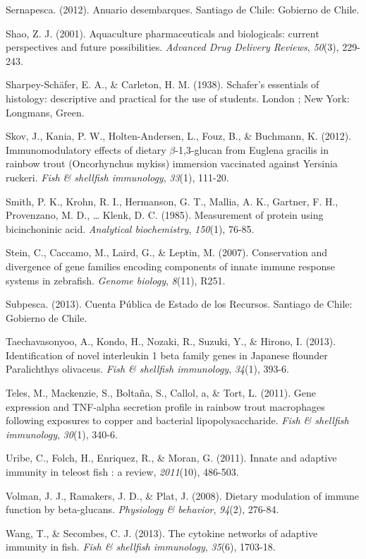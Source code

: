 \documentclass[12pt,letterpaper,oneside]{scrbook}
\begin{document}
Sernapesca. (2012). Anuario desembarques. Santiago de Chile: Gobierno de
Chile.

Shao, Z. J. (2001). Aquaculture pharmaceuticals and biologicals: current
perspectives and future possibilities. \emph{Advanced Drug Delivery
Reviews}, \emph{50}(3), 229-243.

Sharpey-Schäfer, E. A., \& Carleton, H. M. (1938). Schafer's essentials
of histology: descriptive and practical for the use of students. London
; New York: Longmans, Green.

Skov, J., Kania, P. W., Holten-Andersen, L., Fouz, B., \& Buchmann, K.
(2012). Immunomodulatory effects of dietary \(\beta\)-1,3-glucan from
Euglena gracilis in rainbow trout (Oncorhynchus mykiss) immersion
vaccinated against Yersinia ruckeri. \emph{Fish \& shellfish
immunology}, \emph{33}(1), 111-20.

Smith, P. K., Krohn, R. I., Hermanson, G. T., Mallia, A. K., Gartner, F.
H., Provenzano, M. D., \ldots{} Klenk, D. C. (1985). Measurement of
protein using bicinchoninic acid. \emph{Analytical biochemistry},
\emph{150}(1), 76-85.

Stein, C., Caccamo, M., Laird, G., \& Leptin, M. (2007). Conservation
and divergence of gene families encoding components of innate immune
response systems in zebrafish. \emph{Genome biology}, \emph{8}(11),
R251.

Subpesca. (2013). Cuenta Pública de Estado de los Recursos. Santiago de
Chile: Gobierno de Chile.

Taechavasonyoo, A., Kondo, H., Nozaki, R., Suzuki, Y., \& Hirono, I.
(2013). Identification of novel interleukin 1 beta family genes in
Japanese flounder Paralichthys olivaceus. \emph{Fish \& shellfish
immunology}, \emph{34}(1), 393-6.

Teles, M., Mackenzie, S., Boltaña, S., Callol, a, \& Tort, L. (2011).
Gene expression and TNF-alpha secretion profile in rainbow trout
macrophages following exposures to copper and bacterial
lipopolysaccharide. \emph{Fish \& shellfish immunology}, \emph{30}(1),
340-6.

Uribe, C., Folch, H., Enriquez, R., \& Moran, G. (2011). Innate and
adaptive immunity in teleost fish : a review, \emph{2011}(10), 486-503.

Volman, J. J., Ramakers, J. D., \& Plat, J. (2008). Dietary modulation
of immune function by beta-glucans. \emph{Physiology \& behavior},
\emph{94}(2), 276-84.

Wang, T., \& Secombes, C. J. (2013). The cytokine networks of adaptive
immunity in fish. \emph{Fish \& shellfish immunology}, \emph{35}(6),
1703-18.
\end{document}
